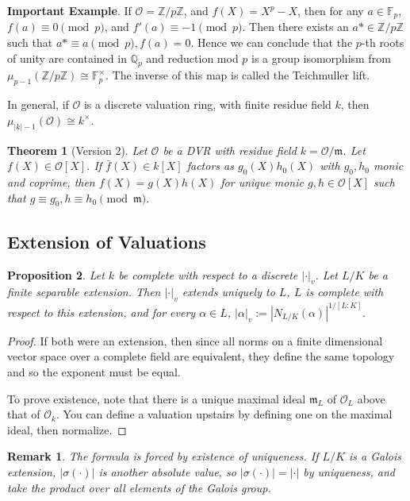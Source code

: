 \documentclass[letterpaper, 12pt]{article}
\newtheorem{rmk}{Remark}
\newtheorem{thm}{Theorem}[subsection]
\newtheorem{prop}[thm]{Proposition}
\newcommand{\roi}[1]{\mathcal{O}_{#1}}
\newcommand{\iso}{\cong}
\newcommand{\Zp}{\mathbb{Z}/p\mathbb{Z}}
\newcommand{\Q}{\mathbb{Q}}
\newcommand{\Qp}{\Q_p}
\begin{document}
\textbf{Important Example}. If $\mathcal{O} = \Zp$, and $f(X) = X^p - X$, then for any $a \in \mathbb{F}_p$, $f(a) \equiv 0 \pmod p$, and $f'(a) \equiv -1 \pmod p$. Then there exists an $a* \in \Zp$ such that $a* \equiv a \pmod p, f(a) = 0$. Hence we can conclude that the $p$-th roots of unity are contained in $\Qp$ and reduction mod $p$ is a group isomorphism from $\mu_{p - 1}(\Zp) \iso \mathbb{F}_p^\times$. The inverse of this map is called the Teichmuller lift.

In general, if $\mathcal{O}$ is a discrete valuation ring, with finite residue field $k$, then $\mu_{|k| - 1}(\mathcal{O}) \iso k^\times$.

\begin{thm}[Version 2]
  Let $\mathcal{O}$ be a DVR with residue field $k = \mathcal{O}/\mathfrak{m}$. Let $f(X) \in \mathcal{O}[X]$. If $\bar{f}(X) \in k[X]$ factors as $g_0(X) h_0(X)$ with $g_0, h_0$ monic and coprime, then $f(X) = g(X) h(X)$ for unique monic $g, h \in \mathcal{O}[X]$ such that $g \equiv g_0, h \equiv h_0 \pmod{\mathfrak{m}}$.
\end{thm}

\subsection{Extension of Valuations}
\begin{prop}
Let $k$ be complete with respect to a discrete $| \cdot |_v$. Let $L/K$ be a finite separable extension. Then $| \cdot |_v$ extends uniquely to $L$, $L$ is complete with respect to this extension, and for every $\alpha \in L$, $|\alpha|_v := |N_{L/K}(\alpha)|^{1/[L:K]}.$
\end{prop}

\begin{proof}
If both were an extension, then since all norms on a finite dimensional vector space over a complete field are equivalent, they define the same topology and so the exponent must be equal.

  To prove existence, note that there is a unique maximal ideal $\mathfrak{m}_L$ of $\mathcal{O}_L$ above that of $\roi k$. You can define a valuation upstairs by defining one on the maximal ideal, then normalize.
\end{proof}
\begin{rmk}
The formula is forced by existence of uniqueness. If $L/K$ is a Galois extension, $|\sigma( \cdot )|$ is another absolute value, so $| \sigma (\cdot)| = | \cdot |$ by uniqueness, and take the product over all elements of the Galois group.
\end{rmk}
\end{document}
